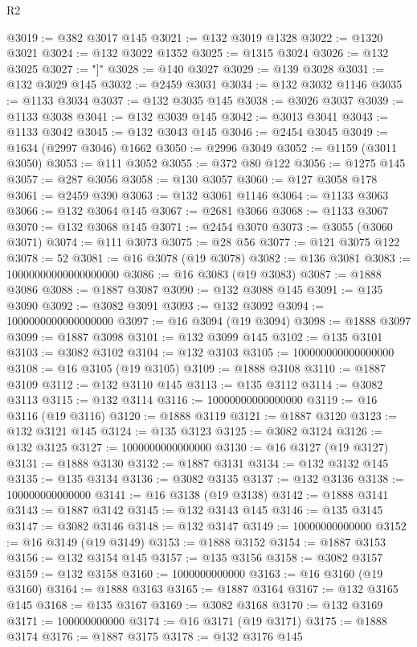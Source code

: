 \begin{lexlean}{R2}
\begin{coremodule}
@3019 := @382 @3017 @145
@3021 := @132 @3019 @1328
@3022 := @1320 @3021
@3024 := @132 @3022 @1352
@3025 := @1315 @3024
@3026 := @132 @3025
@3027 := "]"
@3028 := @140 @3027
@3029 := @139 @3028
@3031 := @132 @3029 @145
@3032 := @2459 @3031
@3034 := @132 @3032 @1146
@3035 := @1133 @3034
@3037 := @132 @3035 @145
@3038 := @3026 @3037
@3039 := @1133 @3038
@3041 := @132 @3039 @145
@3042 := @3013 @3041
@3043 := @1133 @3042
@3045 := @132 @3043 @145
@3046 := @2454 @3045
@3049 := @1634 (@2997 @3046) @1662
@3050 := @2996 @3049
@3052 := @1159 (@3011 @3050)
@3053 := @111 @3052
@3055 := @372 @80 @122
@3056 := @1275 @145
@3057 := @287 @3056
@3058 := @130 @3057
@3060 := @127 @3058 @178
@3061 := @2459 @390
@3063 := @132 @3061 @1146
@3064 := @1133 @3063
@3066 := @132 @3064 @145
@3067 := @2681 @3066
@3068 := @1133 @3067
@3070 := @132 @3068 @145
@3071 := @2454 @3070
@3073 := @3055 (@3060 @3071)
@3074 := @111 @3073
@3075 := @28 @56
@3077 := @121 @3075 @122
@3078 := 52
@3081 := @16 @3078 (@19 @3078)
@3082 := @136 @3081
@3083 := 10000000000000000000
@3086 := @16 @3083 (@19 @3083)
@3087 := @1888 @3086
@3088 := @1887 @3087
@3090 := @132 @3088 @145
@3091 := @135 @3090
@3092 := @3082 @3091
@3093 := @132 @3092
@3094 := 1000000000000000000
@3097 := @16 @3094 (@19 @3094)
@3098 := @1888 @3097
@3099 := @1887 @3098
@3101 := @132 @3099 @145
@3102 := @135 @3101
@3103 := @3082 @3102
@3104 := @132 @3103
@3105 := 100000000000000000
@3108 := @16 @3105 (@19 @3105)
@3109 := @1888 @3108
@3110 := @1887 @3109
@3112 := @132 @3110 @145
@3113 := @135 @3112
@3114 := @3082 @3113
@3115 := @132 @3114
@3116 := 10000000000000000
@3119 := @16 @3116 (@19 @3116)
@3120 := @1888 @3119
@3121 := @1887 @3120
@3123 := @132 @3121 @145
@3124 := @135 @3123
@3125 := @3082 @3124
@3126 := @132 @3125
@3127 := 1000000000000000
@3130 := @16 @3127 (@19 @3127)
@3131 := @1888 @3130
@3132 := @1887 @3131
@3134 := @132 @3132 @145
@3135 := @135 @3134
@3136 := @3082 @3135
@3137 := @132 @3136
@3138 := 100000000000000
@3141 := @16 @3138 (@19 @3138)
@3142 := @1888 @3141
@3143 := @1887 @3142
@3145 := @132 @3143 @145
@3146 := @135 @3145
@3147 := @3082 @3146
@3148 := @132 @3147
@3149 := 10000000000000
@3152 := @16 @3149 (@19 @3149)
@3153 := @1888 @3152
@3154 := @1887 @3153
@3156 := @132 @3154 @145
@3157 := @135 @3156
@3158 := @3082 @3157
@3159 := @132 @3158
@3160 := 1000000000000
@3163 := @16 @3160 (@19 @3160)
@3164 := @1888 @3163
@3165 := @1887 @3164
@3167 := @132 @3165 @145
@3168 := @135 @3167
@3169 := @3082 @3168
@3170 := @132 @3169
@3171 := 100000000000
@3174 := @16 @3171 (@19 @3171)
@3175 := @1888 @3174
@3176 := @1887 @3175
@3178 := @132 @3176 @145

\end{coremodule}
\end{lexlean}

